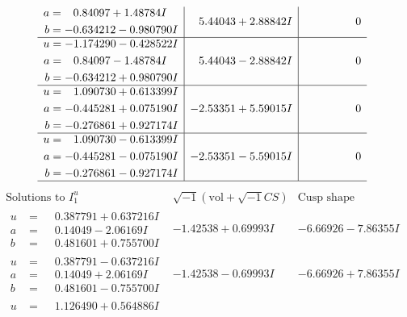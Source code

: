 \documentclass[1p]{elsarticle_modified}
\theoremstyle{definition}
\newcommand{\I}{\sqrt{-1}}
\begin{document}
$$\begin{array}{c|c|c}
\begin{aligned}
a &= \phantom{-}0.84097 + 1.48784 I \\
b &= -0.634212 - 0.980790 I\end{aligned}
 & \phantom{-}5.44043 + 2.88842 I & \phantom{-0.000000 } 0 \\ \hline\begin{aligned}
u &= -1.174290 - 0.428522 I \\
a &= \phantom{-}0.84097 - 1.48784 I \\
b &= -0.634212 + 0.980790 I\end{aligned}
 & \phantom{-}5.44043 - 2.88842 I & \phantom{-0.000000 } 0 \\ \hline\begin{aligned}
u &= \phantom{-}1.090730 + 0.613399 I \\
a &= -0.445281 + 0.075190 I \\
b &= -0.276861 + 0.927174 I\end{aligned}
 & -2.53351 + 5.59015 I & \phantom{-0.000000 } 0 \\ \hline\begin{aligned}
u &= \phantom{-}1.090730 - 0.613399 I \\
a &= -0.445281 - 0.075190 I \\
b &= -0.276861 - 0.927174 I\end{aligned}
 & -2.53351 - 5.59015 I & \phantom{-0.000000 } 0\\
 \hline 
 \end{array}$$\newpage$$\begin{array}{c|c|c}  
\text{Solutions to }I^u_{1}& \I (\text{vol} + \sqrt{-1}CS) & \text{Cusp shape}\\
 \hline 
\begin{aligned}
u &= \phantom{-}0.387791 + 0.637216 I \\
a &= \phantom{-}0.14049 - 2.06169 I \\
b &= \phantom{-}0.481601 + 0.755700 I\end{aligned}
 & -1.42538 + 0.69993 I & -6.66926 - 7.86355 I \\ \hline\begin{aligned}
u &= \phantom{-}0.387791 - 0.637216 I \\
a &= \phantom{-}0.14049 + 2.06169 I \\
b &= \phantom{-}0.481601 - 0.755700 I\end{aligned}
 & -1.42538 - 0.69993 I & -6.66926 + 7.86355 I \\ \hline\begin{aligned}
u &= \phantom{-}1.126490 + 0.564886 I \\

\end{aligned}
\end{array}$$
\end{document}
